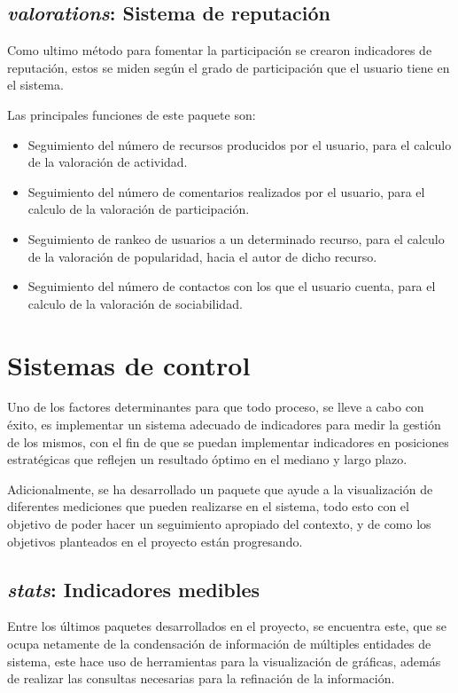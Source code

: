 \subsection{\emph{valorations}: Sistema de reputación}
Como ultimo método para fomentar la participación se crearon indicadores de
reputación, estos se miden según el grado de participación que el usuario tiene
en el sistema.

Las principales funciones de este paquete son:
\begin{itemize}
\item Seguimiento del número de recursos producidos por el usuario, para el
calculo de la valoración de actividad.
\item Seguimiento del número de comentarios realizados por el usuario, para el
calculo de la valoración de participación.
\item Seguimiento de rankeo de usuarios a un determinado recurso, para el
calculo de la valoración de popularidad, hacia el autor de dicho recurso.
\item Seguimiento del número de contactos con los que el usuario cuenta, para el
calculo de la valoración de sociabilidad.
\end{itemize}

\section{Sistemas de control}
Uno de los factores determinantes para que todo proceso, se lleve a cabo con
éxito, es implementar un sistema adecuado de indicadores para medir la gestión
de los mismos, con el fin de que se puedan implementar indicadores en posiciones
estratégicas que reflejen un resultado óptimo en el mediano y largo
plazo\cite{Silva}.

Adicionalmente, se ha desarrollado un paquete que ayude a la visualización de
diferentes mediciones que pueden realizarse en el sistema, todo esto con el
objetivo de poder hacer un seguimiento apropiado del contexto, y de como los
objetivos planteados en el proyecto están progresando.

\subsection{\emph{stats}: Indicadores medibles}
Entre los últimos paquetes desarrollados en el proyecto, se encuentra este, que
se ocupa netamente de la condensación de información de múltiples entidades de
sistema, este hace uso de herramientas para la visualización de gráficas, además
de realizar las consultas necesarias para la refinación de la información.

